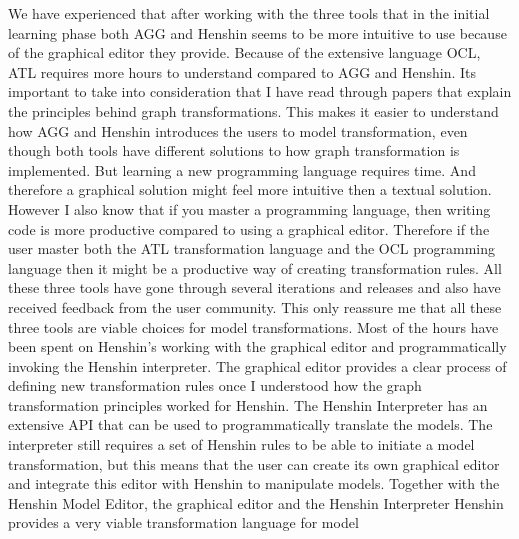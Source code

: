 We have experienced that after working with the three tools that in the initial
learning phase both AGG and Henshin seems to be more intuitive to use because of the
graphical editor they provide. Because of the extensive language OCL, ATL
requires more hours to understand compared to AGG and Henshin. Its important to
take into consideration that I have read through papers that explain the
principles behind graph transformations. This makes it easier to understand how
AGG and Henshin introduces the users to model transformation, even though both
tools have different solutions to how graph transformation is implemented. But
learning a new programming language requires time. And therefore a graphical
solution might feel more intuitive then a textual solution. However I also know
that if you master a programming language, then writing code is more productive
compared to using a graphical editor. Therefore if the user master both the ATL
transformation language and the OCL programming language then it might be a
productive way of creating transformation rules. All these three tools have gone
through several iterations and releases and also have received feedback from the
user community. This only reassure me that all these three tools are viable
choices for model transformations. Most of the hours have been spent on
Henshin's working with the graphical editor and programmatically
invoking the Henshin interpreter. The graphical editor provides a clear
process of defining new transformation rules once I understood how the graph
transformation principles worked for Henshin. The Henshin Interpreter has
an extensive API that can be used to programmatically translate the
models. The interpreter still requires a set of Henshin rules to be able to
initiate a model transformation, but this means that the user can create its own
graphical editor and integrate this editor with Henshin to manipulate models.
Together with the Henshin Model Editor, the graphical editor and the Henshin
Interpreter Henshin provides a very viable transformation language for model
